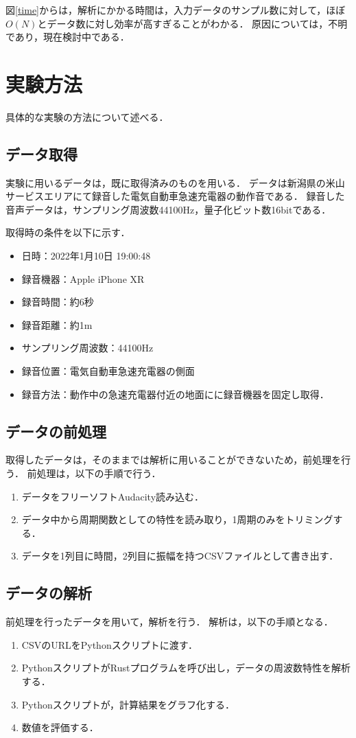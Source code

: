 \documentclass[dvipdfmx,titlepage,a4j]{jsarticle}  %
\begin{document}
図\ref{time}からは，解析にかかる時間は，入力データのサンプル数に対して，ほぼ$O(N)$とデータ数に対し効率が高すぎることがわかる．
原因については，不明であり，現在検討中である．

\section{実験方法}
具体的な実験の方法について述べる．

\subsection{データ取得}
実験に用いるデータは，既に取得済みのものを用いる．
データは新潟県の米山サービスエリアにて録音した電気自動車急速充電器の動作音である．
録音した音声データは，サンプリング周波数44100Hz，量子化ビット数16bitである．

取得時の条件を以下に示す．
\begin{itemize}
  \item 日時：2022年1月10日 19:00:48
  \item 録音機器：Apple iPhone XR
  \item 録音時間：約6秒
  \item 録音距離：約1m
  \item サンプリング周波数：44100Hz
  \item 録音位置：電気自動車急速充電器の側面
  \item 録音方法：動作中の急速充電器付近の地面にに録音機器を固定し取得．
\end{itemize}

\subsection{データの前処理}
\label{preprocess}
取得したデータは，そのままでは解析に用いることができないため，前処理を行う．
前処理は，以下の手順で行う．
\begin{enumerate}
  \item データをフリーソフトAudacity読み込む．
  \item データ中から周期関数としての特性を読み取り，1周期のみをトリミングする．
  \item データを1列目に時間，2列目に振幅を持つCSVファイルとして書き出す．
\end{enumerate}

\subsection{データの解析}
前処理を行ったデータを用いて，解析を行う．
解析は，以下の手順となる．
\begin{enumerate}
  \item CSVのURLをPythonスクリプトに渡す．
  \item PythonスクリプトがRustプログラムを呼び出し，データの周波数特性を解析する．
  \item Pythonスクリプトが，計算結果をグラフ化する．
  \item 数値を評価する．
\end{enumerate}
\end{document}
